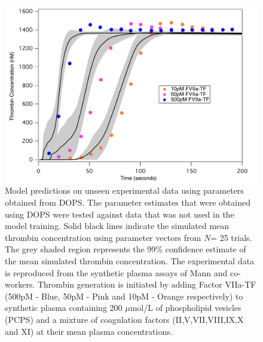 \documentclass[12pt]{article}
\begin{document}
\begin{figure}[h]
\centering
\includegraphics[width=1.0\textwidth,height=0.5\textheight]{./figs/Figure_5_Sim_Validate_E2_E4_E6.pdf}
\caption{Model predictions on unseen experimental data using parameters obtained from DOPS. The parameter estimates that were obtained using DOPS were tested against data that was not used in the model training. Solid black lines indicate the simulated mean thrombin concentration using parameter vectors from $N$= 25 trials. The grey shaded region represents the 99\% confidence estimate of the mean simulated thrombin concentration. The experimental data is reproduced from the synthetic plasma assays of Mann and co-workers. Thrombin generation is initiated by adding Factor VIIa-TF (500pM - Blue, 50pM - Pink and 10pM - Orange respectively) to synthetic plasma containing 200 $\mu$mol/L of phospholipid vesicles (PCPS) and a mixture of coagulation factors (II,V,VII,VIII,IX,X and XI) at their mean plasma concentrations.
}\label{fig-validation}
\end{figure}
\end{document}
